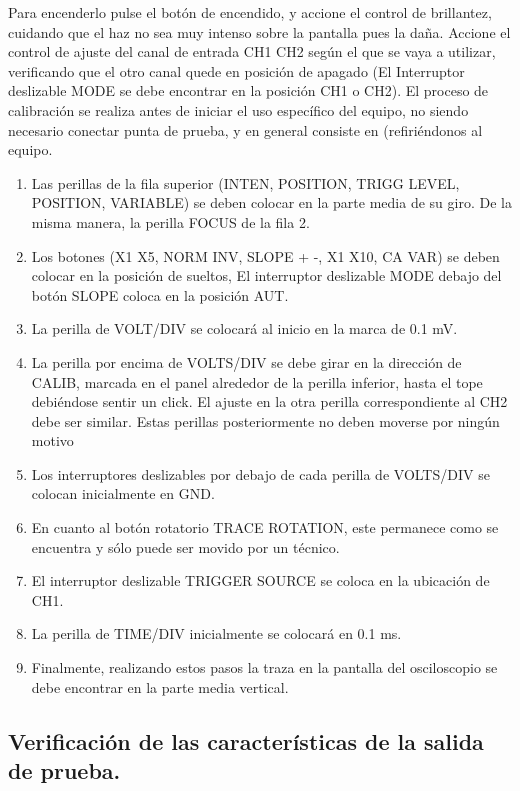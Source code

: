 \documentclass[11pt]{article}
\begin{document}
\begin{multicols}{2}
			Para encenderlo pulse el botón de encendido, y accione el control de brillantez, cuidando que el haz no sea muy intenso sobre la pantalla pues la daña. Accione el control de ajuste del canal de entrada CH1 CH2 según el que se vaya a utilizar, verificando que el otro canal quede en posición de apagado (El Interruptor deslizable MODE se debe encontrar en la posición CH1 o CH2).
			El proceso de calibración se realiza antes de iniciar el uso específico del equipo, no siendo necesario conectar punta de prueba, y en general consiste en (refiriéndonos al equipo.

			\begin{enumerate}
				\item Las perillas de la fila superior (INTEN, POSITION, TRIGG LEVEL, POSITION, VARIABLE) se deben colocar en la parte media de su giro. De la misma manera, la perilla FOCUS de la fila 2.
				\item Los botones (X1 X5, NORM INV, SLOPE + -, X1 X10, CA VAR) se deben colocar en la posición de sueltos, El interruptor deslizable MODE debajo del botón SLOPE coloca en la posición AUT.
				\item La perilla de VOLT/DIV se colocará al inicio en la marca de 0.1 mV.
				\item La perilla por encima de VOLTS/DIV se debe girar en la dirección de CALIB, marcada en el panel alrededor de la perilla inferior, hasta el tope debiéndose sentir un click. El ajuste en la otra perilla correspondiente al CH2 debe ser similar. Estas perillas posteriormente no deben moverse por ningún motivo
				\item Los interruptores deslizables por debajo de cada perilla de VOLTS/DIV se colocan inicialmente en GND.
				\item En cuanto al botón rotatorio TRACE ROTATION, este permanece como se encuentra y sólo puede ser movido por un técnico.
				\item El interruptor deslizable TRIGGER SOURCE se coloca en la ubicación de CH1.
				\item La perilla de TIME/DIV inicialmente se colocará en 0.1 ms.
				\item Finalmente, realizando estos pasos la traza en la pantalla del osciloscopio se debe encontrar en la parte media vertical.
			\end{enumerate}

	\subsection{Verificación de las características de la salida de prueba.}


\end{multicols}
\end{document}
